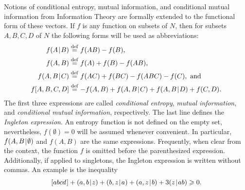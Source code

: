 \documentclass[reqno]{amsart}
\theoremstyle{definition}
\newcommand\tsp{\mkern 1.5mu}
\def\|{\mkern1.5mu{|}\mkern1.5mu}
\renewcommand\ge{\geqslant}\renewcommand\le{\leqslant}
\newcommand\eqdef{\stackrel{\mathrm{def}}{=}}
\def\abcd{[abcd\tsp]}
\begin{document}
Notions of conditional entropy, mutual information, and conditional mutual
information from Information Theory are formally extended to the functional
form of these vectors. If $f$ is any function on subsets of $N$, then for
subsets $A,B,C,D$ of $N$ the following forms will be used as abbreviations:
\begin{align*}
   f(A\|B) &\eqdef f(AB)-f(B), \\
   f(A,B)  &\eqdef f(A)+f(B)-f(AB), \\
   f(A,B\|C) &\eqdef f(AC)+f(BC)-f(ABC)-f(C), \mbox{ and}\\
   f[A,B,C,D] &\eqdef -f(A,B)+f(A,B\|C)+f(A,B\|D)+f(C,D).
\end{align*}
The first three expressions are called \emph{conditional entropy},
\emph{mutual information}, and \emph{conditional mutual information},
respectively. The last line defines the \emph{Ingleton expression}. An
entropy function is not defined on the empty set, nevertheless,
$f(\emptyset)=0$ will be assumed whenever convenient. In particular,
$f(A,B\|\emptyset)$ and $f(A,B)$ are the same expressions. Frequently, when
clear from the context, the function $f$ is omitted before the parenthesized
expression. Additionally, if applied to singletons, the Ingleton expression
is written without commas. An example is the inequality
\begin{equation}\label{eq:sampleineq}
  \abcd+(a,b\|z)+(b,z\|a)+(a,z\|b)+3(z\|ab) \ge 0.
\end{equation}
\end{document}
